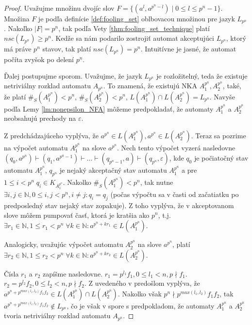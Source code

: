 \begin{proof}
Uvažujme množinu dvojíc slov $ F = \lbrace (a^{l},a^{p^n-l}) \; | \; 0 \leq l \leq p^n-1 \rbrace $. Množina $ F $ je podľa definície \ref{def:fooling_set} oblbovacou množinou pre jazyk $ L_{p^n} $. Nakoľko $ |F|=p^n $, tak podľa Vety \ref{thm:fooling_set_technique} platí $ nsc(L_{p^n}) \geq p^n $. Kedže sa nám podarilo zostrojiť automat akceptujúci $ L_{p^n} $, ktorý má práve $ p^n $ stavov, tak platí $ nsc(L_{p^n}) = p^n$. Intuitívne je jasné, že automat \glqq{}počíta zvyšok po delení $ p^n $\grqq{}.
\par
Ďalej postupujme sporom. Uvažujme, že jazyk $ L_{p^n} $ je rozložitelný, teda že existuje netriviálny rozklad automatu $ A_{p^n} $. To znamená, že existujú NKA $ A_1^{p^n}, A_2^{p^n} $, také, že platí $ \#_S(A_1^{p^n}) < p^n $, $ \#_S(A_2^{p^n}) < p^n $, $ L(A_1^{p^n}) \cap L(A_2^{p^n}) = L_{p^n} $. Navyše podľa Lemy \ref{lm:nonepsilon_NFA} môžeme predpokladať, že automaty $ A_1^{p^n}$ a $ A_2^{p^n} $ neobsahujú prechody na $ \varepsilon $. 
\par
Z predchádzajúceho vyplýva, že $ a^{p^n} \in L(A_1^{p^n}), a^{p^n} \in L(A_2^{p^n})$. Teraz sa pozrime na výpočet automatu $ A_1^{p^n} $ na slove $ a^{p^n} $. Nech tento výpočet vyzerá nasledovne $ (q_0,a^{p^n}) \vdash (q_1,a^{p^n-1}) \vdash \dots \vdash (q_{p^n-1},a) \vdash (q_{p^n},\varepsilon) $, kde $ q_0 $ je počiatočný stav automatu $ A_1^{p^n} $, $ q_{p^n} $ je nejaký akceptačný stav automatu $ A_1^{p^n} $ a pre $ 1 \leq i < p^n \; q_i \in K_{A_1^{p^n}}$. Nakolko $ \#_S(A_1^{p^n}) < p^n $, tak nutne $ \exists i,j \in \mathbb{N}, 0 \leq i,j < p^n, i \neq j: q_i = q_j $ (počas výpočtu sa v časti \glqq{}od začatiatku po predposledný stav\grqq{} nejaký stav zopakuje). Z toho vyplýva, že v akceptovanom slove môžem pumpovať časť, ktorá je kratšia ako $ p^n $, t.j. $ \exists r_1 \in \mathbb{N}, 1 \leq r_1 < p^n \; \forall k \in \mathbb{N}: a^{p^n+kr_1} \in L(A_1^{p^n})$. 
\par
Analogicky, uvažujúc výpočet automatu $ A_2^{p^n} $ na slove $ a^{p^n} $, platí $ \exists r_2 \in \mathbb{N}, 1 \leq r_2 < p^n \; \forall k \in \mathbb{N}: a^{p^n+kr_2} \in L(A_2^{p^n})$.
\par
Čísla $ r_1 $ a $ r_2 $ zapíšme nasledovne. $ r_1 = p^{l_1}f_1, 0 \leq l_1 < n, p \nmid f_1 $. $ r_2 = p^{l_2}f_2, 0 \leq l_2 < n, p \nmid f_2 $. Z uvedeného v predošlom vyplýva, že $ a^{p^n + p^{max(l_1,l_2)}f_1f_2} \in L(A_1^{p^n}) \cap L(A_2^{p^n}) $. Nakolko však $ p^n \nmid p^{max(l_1,l_2)}f_1f_2$, tak $ a^{p^n + p^{max(l_1,l_2)}f_1f_2} \notin L_{p^n} $, čo je však v spore s predpokladom, že automaty $ A_1^{p^n} $ a $ A_2^{p^n} $ tvoria netriviálny rozklad automatu $ A_{p^n} $.
\end{proof}

